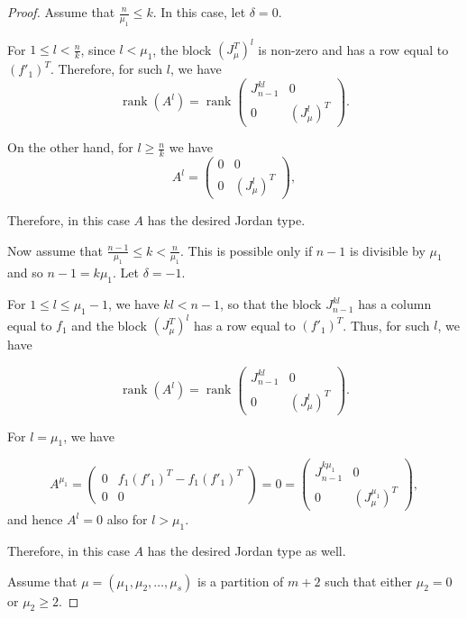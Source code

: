 \documentclass[10pt,a4paper]{amsart}
\DeclareMathOperator{\rank}{rank}
\begin{document}
\begin{proof}
 Assume that $\frac{n}{\mu_1}\leq k$. In this case, let $\delta=0$. 

For  $1\leq l<\frac{n}{k}$, since $l<\mu_1$, the block $  \left(J^T_{\mu }\right)^l$ is non-zero and has a row equal to $(f'_1)^T$. Therefore, for such $l$, we have 
\[\rank(A^l)=\rank\left(
\begin{array}{c|c}
    J_{n-1}^{kl} &0 \\
    \hline
    0 & \left(J^l_{\mu }\right)^T
\end{array}
\right). \]

On the other hand, for $l\geq \frac{n}{k}$ we have 
\[A^l=\left(
\begin{array}{c|c}
   0 &0 \\
    \hline
    0 & \left(J^l_{\mu }\right)^T
\end{array}
\right), \]

Therefore, in this case $A$ has the desired Jordan type.

 Now assume that $\frac{n-1}{\mu_1}\leq k <\frac{n}{\mu_1}$. This is possible only if $n-1$ is divisible by $\mu_1$ and so $n-1=k\mu_1$. Let $\delta=-1$. 

For $1\leq l \leq \mu_1-1$, we have $kl<n-1$, so that the block $J_{n-1}^{kl}$ has a column equal to $f_1$ and the block $\left(J^T_{\mu }\right)^l$ has a row equal to $(f'_1)^T$. Thus, for such $l$, we have 

\[\rank(A^l)=\rank\left(
\begin{array}{c|c}
    J_{n-1}^{kl} &0 \\
    \hline
    0 & \left(J^l_{\mu }\right)^T
\end{array}
\right). \]

For $l=\mu_1$, we have 

\[A^{\mu_1}=\left(
\begin{array}{c|c}
    0 & f_{1}(f'_1)^T- f_1\left(f'_{1}\right)^T \\
    \hline
    0 & 0
\end{array}
\right)=0=\left(
\begin{array}{c|c}
    J_{n-1}^{k\mu_1} & 0 \\
    \hline
    0 & \left(J^{\mu_1}_{\mu }\right)^{T}
\end{array}
\right), 
\]
and hence $A^l=0$ also for $l>\mu_1$.


Therefore, in this case $A$ has the desired Jordan type as well.


 Assume that $\mu=(\mu_1,\mu_2, \ldots, \mu_s)$ is a partition of $m+2$ such that either $\mu_2=0$ or  $\mu_2\geq 2$. 


\end{proof}
\end{document}
